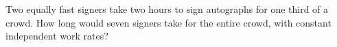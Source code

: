 Two equally fast signers take two hours to sign autographs for one third of a crowd. How long would seven signers take for the entire crowd, with constant independent work rates?
